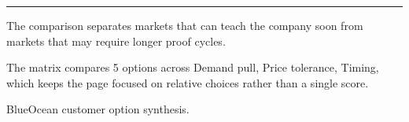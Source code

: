 \documentclass[10pt,a4paper]{article}
\begin{document}
\vspace{3pt}\noindent\begin{minipage}[t]{0.58\linewidth}
\textcolor{BOGreen}{\rule{24mm}{0.6pt}}\par\vspace{3pt}
{\footnotesize\color{BOText} The comparison separates markets that can teach the company soon from markets that may require longer proof cycles.}\par\vspace{2pt}
{\footnotesize\color{BOText} The matrix compares 5 options across Demand pull, Price tolerance, Timing, which keeps the page focused on relative choices rather than a single score.}\par\vspace{2pt}
\end{minipage}\hfill\begin{minipage}[t]{0.36\linewidth}
\par
\end{minipage}\par\vspace{2pt}
\par
{\scriptsize\color{BOMuted} BlueOcean customer option synthesis.}\par
\end{document}
